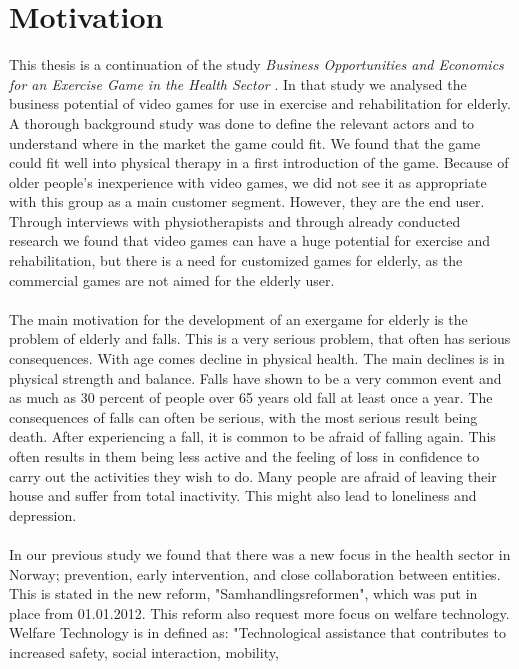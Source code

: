 \chapter{Motivation}
This thesis is a continuation of the study \emph{Business Opportunities and Economics for an Exercise Game in the Health Sector} \cite{project}. In that study we analysed the business potential of video games for use in exercise and rehabilitation for elderly. A thorough background study was done to define the relevant actors and to understand where in the market the game could fit. We found that the game could fit well into physical therapy in a first introduction of the game. Because of older people's inexperience with video games, we did not see it as appropriate with this group as a main customer segment. However, they are the end user. Through interviews with physiotherapists and through already conducted research we found that video games can have a huge potential  for exercise and rehabilitation, but there is a need for customized games for elderly, as the commercial games are not aimed for the elderly user. \\ \\
The main motivation for the development of an exergame for elderly is the problem of elderly and falls. This is a very serious problem, that often has serious consequences. With age comes decline in physical health. The main declines is in physical strength and balance. Falls have shown to be a very common event and as much as 30 percent of people over 65 years old fall at least once a year. The consequences of falls can often be serious, with the most serious result being death. After experiencing a fall, it is common to be afraid of falling again. This often results in them being less active and the feeling of loss in confidence to carry out the activities they wish to do. Many people are afraid of leaving their house and suffer from total inactivity. This might also lead to loneliness and depression. \\ \\
In our previous study \cite{project} we found that there was a new focus in the health sector in Norway; prevention, early intervention, and close collaboration between entities. This is stated in the new reform, "Samhandlingsreformen", which was put in place from 01.01.2012. This reform also request more focus on welfare technology. Welfare Technology is in \cite{welfare} defined as: "Technological assistance that contributes to increased safety, social interaction, mobility,
